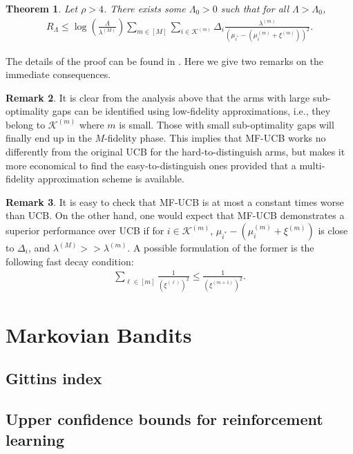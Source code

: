 \documentclass[letterpaper,10pt,openright,openany]{book}
\numberwithin{equation}{section}
\theoremstyle{plain}
\newtheorem{Th}{Theorem}[section]
\theoremstyle{definition}
\newtheorem{Rem}[Th]{Remark}
\begin{document}
\begin{Th}
Let $\rho>4$. There exists some $\Lambda_0>0$ such that for all $\Lambda>\Lambda_0$, 
\begin{align*}
R_\Lambda \leq\log\left(\frac{\Lambda}{\lambda^{(M)}}\right)\sum_{m\in [M]}\sum_{i\in\mathcal K^{(m)}}\Delta_i\frac{\lambda^{(m)}}{(\mu_{i^*}-(\mu^{(m)}_i+\xi^{(m)}))^2}.
\end{align*}
\end{Th}

The details of the proof can be found in \cite{kandasamy2016multi}. Here we give two remarks on the immediate consequences. 

\begin{Rem}
It is clear from the analysis above that the arms with large sub-optimality gaps can be identified using low-fidelity approximations, i.e., they belong to $\mathcal K^{(m)}$ where $m$ is small. Those with small sub-optimality gaps will finally end up in the $M$-fidelity phase. This implies that MF-UCB works no differently from the original UCB for the hard-to-distinguish arms, but makes it more economical to find the easy-to-distinguish ones provided that a multi-fidelity approximation scheme is available. 
\end{Rem}

\begin{Rem}
It is easy to check that MF-UCB is at most a constant times worse than UCB. On the other hand, one would expect that MF-UCB demonstrates a superior performance over UCB if for $i\in\mathcal K^{(m)}$, $\mu_{i^*}-(\mu^{(m)}_i+\xi^{(m)})$ is close to $\Delta_i$, and $\lambda^{(M)}>>\lambda^{(m)}$. A possible formulation of the former is the following fast decay condition:
\begin{align*}
\sum_{\ell\in [m]}\frac{1}{(\xi^{(\ell)})^2}\leq\frac{1}{(\xi^{(m+1)})^2}. 
\end{align*} 
\end{Rem}


 

\chapter{Markovian Bandits}\label{ch:5}

\section{Gittins index}

\section{Upper confidence bounds for reinforcement learning}



 

\newpage

\printbibliography

 
 
\end{document}
